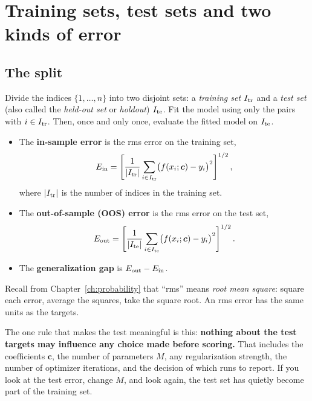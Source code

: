 \section{Training sets, test sets and two kinds of error}\label{sec:generalization-split}

\subsection{The split}

Divide the indices $\{1,\dots,n\}$ into two disjoint sets: a \emph{training set} $I_{\rm tr}$ and a \emph{test set} (also called the \emph{held-out set} or \emph{holdout}) $I_{\rm te}$. Fit the model using only the pairs with $i\in I_{\rm tr}$. Then, once and only once, evaluate the fitted model on $I_{\rm te}$.

\begin{itemize}
\item The \textbf{in-sample error} is the rms error on the training set,
\begin{equation}
E_{\rm in}=\left[\frac{1}{|I_{\rm tr}|}\sum_{i\in I_{\rm tr}}\bigl(f(x_i;\bm c)-y_i\bigr)^2\right]^{1/2},
\label{eq:generalization-Ein}
\end{equation}
where $|I_{\rm tr}|$ is the number of indices in the training set.
\item The \textbf{out-of-sample (OOS) error} is the rms error on the test set,
\begin{equation}
E_{\rm out}=\left[\frac{1}{|I_{\rm te}|}\sum_{i\in I_{\rm te}}\bigl(f(x_i;\bm c)-y_i\bigr)^2\right]^{1/2}.
\label{eq:generalization-Eout}
\end{equation}
\item The \textbf{generalization gap} is $E_{\rm out}-E_{\rm in}$.
\end{itemize}

Recall from Chapter~\ref{ch:probability} that ``rms'' means \emph{root mean square}: square each error, average the squares, take the square root. An rms error has the same units as the targets.

The one rule that makes the test meaningful is this: \textbf{nothing about the test targets may influence any choice made before scoring.} That includes the coefficients $\bm c$, the number of parameters $M$, any regularization strength, the number of optimizer iterations, and the decision of which runs to report. If you look at the test error, change $M$, and look again, the test set has quietly become part of the training set.

